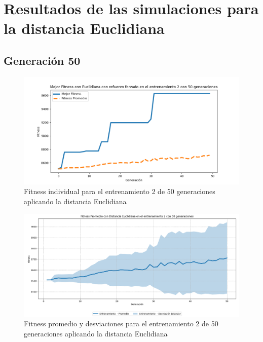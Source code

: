 \documentclass[conference]{IEEEtran}
\begin{document}
\section{Resultados de las simulaciones para la distancia Euclidiana}
\subsection{Generación 50}
\setcounter{figure}{0}
\renewcommand{\thefigure}{S\arabic{figure}A-E}


\begin{figure}[H]
    \centering
    \includegraphics[width=0.9 \linewidth]{Euclidiana/Fitnes_individual/Fitness_2_Eucli_50Gen.png}
    \caption{Fitness individual para el entrenamiento 2 de 50 generaciones aplicando la distancia Euclidiana}
    \label{fig:eucli_2_50}
\end{figure}
\begin{figure}[H]
    \centering
    \includegraphics[width=0.9 \linewidth]{Euclidiana/Fitnes_individual/Fitness_2_Eucli_50Gen_Sombra.png}
    \caption{Fitness promedio y desviaciones para el entrenamiento 2 de 50 generaciones aplicando la distancia Euclidiana}
    \label{fig:eucli_2_50_sombra}
\end{figure}
\end{document}

